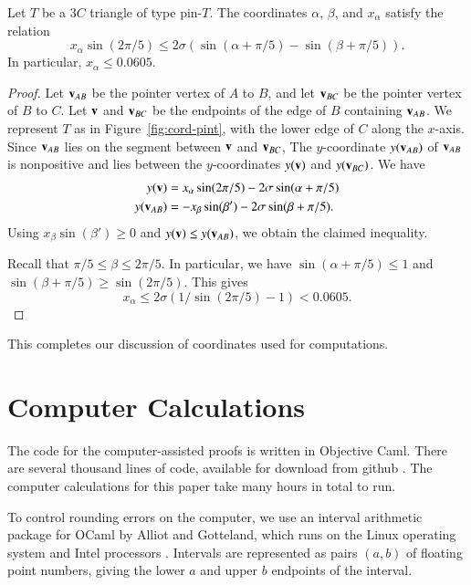 \begin{lemma}\label{lemma:0605}
  Let $T$ be a $3C$ triangle of type pin-$T$.  The coordinates
  $\alpha$, $\beta$, and $x_\alpha$ satisfy the relation
\[
x_\alpha \sin(2\pi/5) \le 2\sigma (\sin(\alpha+\pi/5) - \sin(\beta+\pi/5)).
\]
In particular, $x_\alpha \le 0.0605$.
\end{lemma}

\begin{proof} Let ${\mathbf v}_{AB}$ be the pointer vertex of $A$ to $B$, and
  let ${\mathbf v}_{BC}$ be the pointer vertex of $B$ to $C$.  Let ${\mathbf v}$ and
  ${\mathbf v}_{BC}$ be the endpoints of the edge of $B$ containing ${\mathbf v}_{AB}$.
  We represent $T$ as in Figure~\ref{fig:cord-pint}, with the lower edge of
  $C$ along the $x$-axis.  Since ${\mathbf v}_{AB}$ lies on the segment between
  ${\mathbf v}$ and ${\mathbf v}_{BC}$, The $y$-coordinate $y({\mathbf v}_{AB})$ of ${\mathbf v}_{AB}$ is
  nonpositive and lies between the $y$-coordinates $y({\mathbf v})$ and
  $y({\mathbf v}_{BC})$.  We have
\begin{align*}
y({\mathbf v}) &= x_\alpha \sin(2\pi/5) - 2\sigma\sin(\alpha+\pi/5)\\
y({\mathbf v}_{AB}) & = -x_\beta \sin(\beta') - 2\sigma\sin(\beta+\pi/5).
\end{align*}
Using $x_\beta \sin(\beta')\ge 0$ and $y({\mathbf v}) \le y({\mathbf v}_{AB})$, we
obtain the claimed inequality.

Recall that $\pi/5\le \beta \le 2\pi/5$.  In particular, we have
$\sin(\alpha+\pi/5) \le 1$ and $\sin(\beta+\pi/5)\ge \sin(2\pi/5)$.
This gives
\[
x_\alpha \le 2\sigma(1/\sin(2\pi/5) - 1) < 0.0605.
\]
\end{proof}


This completes our discussion of coordinates used for computations.

\section{Computer Calculations}

  The code for the computer-assisted proofs is written in Objective
  Caml.  There are several thousand lines of code, available for
  download from github \cite{Git}.  The computer calculations for this
  paper take many hours in total to run.  

To control
  rounding errors on the computer, we use an interval arithmetic
  package for OCaml by Alliot and Gotteland, which runs on the Linux
  operating system and Intel processors \cite{All}.  Intervals are represented as 
  pairs $(a,b)$ of floating point numbers, giving the lower $a$ and upper $b$ endpoints
of the interval. 



